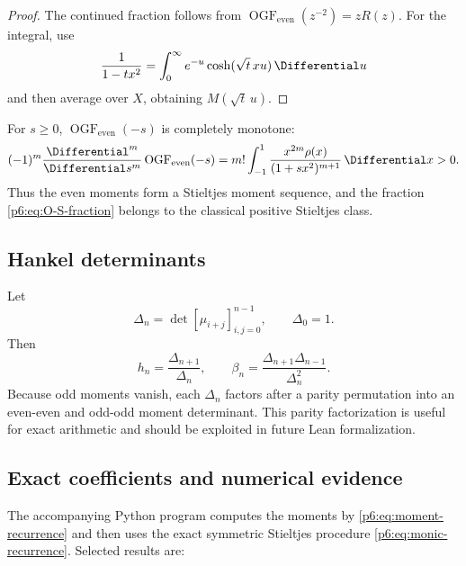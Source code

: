 \documentclass[11pt]{article}
\theoremstyle{definition}
\theoremstyle{remark}
\newcommand{\EvenMomentOrdinaryGeneratingFunction}{\operatorname{OGF}_{\mathrm{even}}}
\begin{document}
\begin{proof}
The continued fraction follows from
\(\EvenMomentOrdinaryGeneratingFunction(z^{-2})=zR(z)\).  For the integral, use
\[
 \frac1{1-tx^2}=\int_0^{\infty}e^{-u}\cosh(\sqrt t\,xu)\,\Differential u
\]
and then average over \(X\), obtaining \(M(\sqrt t\,u)\).
\end{proof}

For \(s\ge0\), \(\EvenMomentOrdinaryGeneratingFunction(-s)\) is completely monotone:
\begin{equation}
 (-1)^m\frac{\Differential^m}{\Differential s^m}
 \EvenMomentOrdinaryGeneratingFunction(-s)
 =m!\int_{-1}^{1}\frac{x^{2m}\rho(x)}{(1+sx^2)^{m+1}}\,\Differential x>0. \label{p6:eq:O-complete-monotone}
\end{equation}
Thus the even moments form a Stieltjes moment sequence, and the fraction
\eqref{p6:eq:O-S-fraction} belongs to the classical positive Stieltjes class.

\subsection{Hankel determinants}

Let
\begin{equation}
 \Delta_n=\det[\mu_{i+j}]_{i,j=0}^{n-1},\qquad \Delta_0=1.  \label{p6:eq:Hankel}
\end{equation}
Then
\begin{equation}
 h_n=\frac{\Delta_{n+1}}{\Delta_n},
 \qquad
 \boxed{\beta_n=\frac{\Delta_{n+1}\Delta_{n-1}}{\Delta_n^2}}. \label{p6:eq:beta-Hankel}
\end{equation}
Because odd moments vanish, each \(\Delta_n\) factors after a parity permutation into an
even-even and odd-odd moment determinant.  This parity factorization is useful for exact
arithmetic and should be exploited in future Lean formalization.

\subsection{Exact coefficients and numerical evidence}

The accompanying Python program computes the moments by
\eqref{p6:eq:moment-recurrence} and then uses the exact symmetric Stieltjes procedure
\eqref{p6:eq:monic-recurrence}.  Selected results are:

\begin{center}

\end{center}
\end{document}
